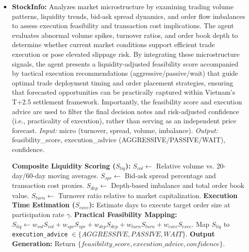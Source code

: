 \documentclass{ieeeaccess}
\begin{document}
\begin{itemize}
    \item \textbf{StockInfo:} 
    Analyzes market microstructure by examining trading volume patterns, liquidity trends, bid-ask spread dynamics, and order flow imbalances to assess execution feasibility and transaction cost implications. The agent evaluates abnormal volume spikes, turnover ratios, and order book depth to determine whether current market conditions support efficient trade execution or pose elevated slippage risk. By integrating these microstructure signals, the agent presents a liquidity-adjusted feasibility score accompanied by tactical execution recommendations (aggressive/passive/wait) that guide optimal trade deployment timing and order placement strategies, ensuring that forecasted opportunities can be practically captured within Vietnam's T+2.5 settlement framework.  
    Importantly, the feasibility score and execution advice are used to filter the final decision notes and risk-adjusted confidence (i.e., practicality of execution), rather than serving as an independent price forecast.
    \textit{Input:} micro (turnover, spread, volume, imbalance).  
    \textit{Output:} feasibility\_score, execution\_advice (AGGRESSIVE/PASSIVE/WAIT), confidence.

    \begin{algorithm}[H]
    \caption{StockInfo microstructure analysis}
    \begin{algorithmic}[1]
    \STATE \textbf{Composite Liquidity Scoring ($S_{liq}$):}
    \STATE \quad $S_{vol} \gets$ Relative volume vs. 20-day/60-day moving averages.
    \STATE \quad $S_{spr} \gets$ Bid-ask spread percentage and transaction cost proxies.
    \STATE \quad $S_{dep} \gets$ Depth-based imbalance and total order book value.
    \STATE \quad $S_{turn} \gets$ Turnover ratio relative to market capitalization.
    \STATE \textbf{Execution Time Estimation ($S_{exec}$):}
    \STATE \quad Estimate days to execute target order size at participation rate $\gamma$.
    \STATE \textbf{Practical Feasibility Mapping:}
    \STATE \quad $S_{liq} \gets w_{vol}S_{vol} + w_{spr}S_{spr} + w_{dep}S_{dep} + w_{turn}S_{turn} + w_{exec}S_{exec}$.
    \STATE \quad Map $S_{liq}$ to \texttt{execution\_advice} $\in \{AGGRESSIVE, PASSIVE, WAIT\}$.
    \STATE \textbf{Output Generation:}
    \STATE \quad Return $\{feasibility\_score, execution\_advice, confidence\}$.
    \end{algorithmic}
    \end{algorithm}
\end{itemize}
\end{document}
